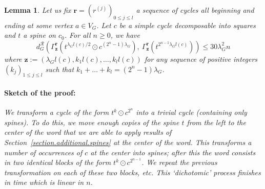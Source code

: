 \documentclass{article}
\newtheorem{lemma}[theorem]{Lemma}
\newtheorem{corollary}[theorem]{Corollary}
\begin{document}

\begin{lemma}\label{lem:lognm}
Let us fix $\textbf{r}=(r^{(j)})_{0 \le j \le l}$ a sequence of cycles all beginning and ending at some vertex $a\in V_G$.
Let $c$ be a simple cycle decomposable into squares and $t$ a spine on $c_0$.
For all $n \ge0$, we have
\[
d_G^\mathcal{R}(\Gamma^{\textbf{r}}_\textbf{z}(t^{\lambda_G l(c)/2}\odot c^{(2^n-1)\lambda_G}),\ \Gamma^{\textbf{r}}_\textbf{z}(t^{2^{n-1} \lambda_G l(c)})) \le 30 \lambda_G^2 n
\]
where $\textbf{z} := (\lambda_G l(c), k_1 l(c), \ldots , k_l l(c))$ for any sequence of positive integers $(k_j)_{1 \le j \le l}$ such that $k_1 + \hdots + k_l = (2^n-1)\lambda_G$.
\end{lemma}


\paragraph{Sketch of the proof:} \textit{We transform a cycle of the form $t^{k}\odot c^{2^n}$ into a trivial cycle (containing only spines). To do this, we move enough copies of the spine $t$ from the left to the center of the word that we are able to apply results of Section~\ref{section.additional.spines} at the center of the word. This transforms a number of occurrences of $c$ at the center into spines; after this the word  consists in two identical blocks of the form $t^k  \odot c^{2^{n-1}}$. We repeat the previous transformation on each of these two blocks, etc. This `dichotomic' process finishes in time which is linear in $n$.}
\end{document}
